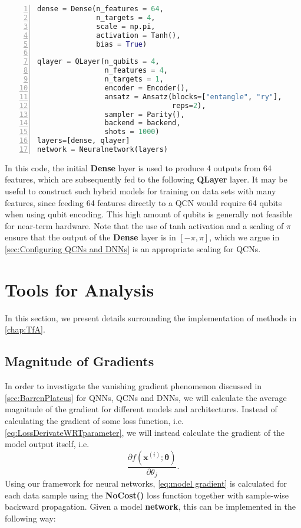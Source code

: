 \begin{lstlisting}[language=python, numbers=left]
dense = Dense(n_features = 64,
              n_targets = 4,
              scale = np.pi,
              activation = Tanh(),
              bias = True)
              
qlayer = QLayer(n_qubits = 4,
                n_features = 4,
                n_targets = 1,
                encoder = Encoder(),
                ansatz = Ansatz(blocks=["entangle", "ry"],
                                reps=2),
                sampler = Parity(),
                backend = backend,
                shots = 1000)
layers=[dense, qlayer]       
network = Neuralnetwork(layers)
\end{lstlisting}
In this code, the initial \textbf{Dense} layer is used to produce 4 outputs from 64 features, which are subsequently fed to the following \textbf{QLayer} layer. It may be useful to construct such hybrid models for training on data sets with many features, since feeding 64 features directly to a QCN would require 64 qubits when using qubit encoding. This high amount of qubits is generally not feasible for near-term hardware. Note that the use of tanh activation and a scaling of $\pi$ ensure that the output of the \textbf{Dense} layer is in $[-\pi, \pi]$, which we argue in \cref{sec:Configuring QCNs and DNNs} is an appropriate scaling for QCNs.


\section{Tools for Analysis}\label{sec:Tools for Analysis Imp}
In this section, we present details surrounding the implementation of methods in \cref{chap:TfA}. 


\subsection{Magnitude of Gradients}\label{sec:Magnitude of Gradients}
In order to investigate the vanishing gradient phenomenon discussed in \cref{sec:BarrenPlateus} for QNNs, QCNs and DNNs, we will calculate the average magnitude of the gradient for different models and architectures. Instead of calculating the gradient of some loss function, i.e. \cref{eq:LossDerivateWRTparameter}, we will instead calculate the gradient of the model output itself, i.e.
\begin{equation}\label{eq:model gradient}
    \frac{\partial f(\boldsymbol{x}^{(i)};\boldsymbol{\theta})}{\partial \theta_j}.
\end{equation}
Using our framework for neural networks, \cref{eq:model gradient} is calculated for each data sample using the \textbf{NoCost()} loss function together with sample-wise backward propagation. Given a model \textbf{network}, this can be implemented in the following way:

